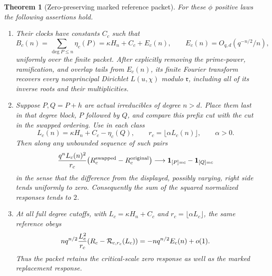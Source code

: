 \documentclass[11pt]{article}
\newtheorem{theorem}{Theorem}[section]
\begin{document}
\begin{theorem}[Zero-preserving marked reference packet]
\label{thm:completeMarkedPacket}
For these \(\phi\) positive laws the following assertions hold.
\begin{enumerate}
\item Their clocks have constants \(C_c\) such that
\[
 B_c(n)=\sum_{\deg P\leq n}\eta_c(P)
       =\kappa H_n+C_c+E_c(n),\qquad
 E_c(n)=O_{q,d}(q^{-n/2}/n),
\]
uniformly over the finite packet.
After explicitly removing the prime-power, ramification, and overlap
tails from \(E_c(n)\), its finite Fourier transform recovers every
nonprincipal Dirichlet \(L(u,\chi)\) modulo \(\mathfrak r\), including
all of its inverse roots and their multiplicities.
\item Suppose \(P,Q=P+h\) are actual irreducibles of degree \(n>d\).
Place them last in that degree block, \(P\) followed by \(Q\), and
compare this prefix cut with the cut in the swapped ordering.
Use in each class
\[
 L_c(n)=\kappa H_n+C_c-\eta_c(Q),\qquad
 r_c=\lfloor\alpha L_c(n)\rfloor,\qquad \alpha>0.
\]
Then along any unbounded sequence of such pairs
\begin{equation}\label{eq:packetResponse}
 \frac{q^n L_c(n)^2}{r_c}
       \bigl(R_c^{\rm swapped}-R_c^{\rm original}\bigr)
 \longrightarrow \mathbf1_{[P]=c}-\mathbf1_{[Q]=c}
\end{equation}
in the sense that the difference from the displayed, possibly varying,
right side tends uniformly to zero. Consequently the sum of the
squared normalized responses tends to \(2\).
\item At all full degree cutoffs, with \(L_c=\kappa H_n+C_c\) and
\(r_c=\lfloor\alpha L_c\rfloor\), the same reference obeys
\[
 nq^{n/2}\frac{L_c^2}{r_c}
       (R_c-{\cal R}_{c,r_c}(L_c))
       =-nq^{n/2}E_c(n)+o(1).
\]
Thus the packet retains the critical-scale zero response as well as
the marked replacement response.
\end{enumerate}
\end{theorem}
\end{document}
